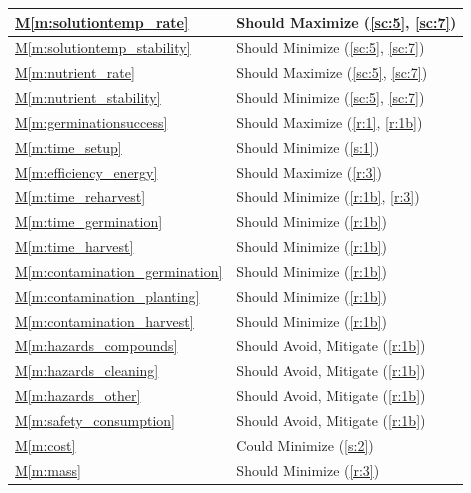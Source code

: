 \documentclass{report}
\newcommand{\mref}[1]{\hyperref[#1]{M\ref{#1}}}
\begin{document}
\begin{tabular}{|l|p{14.35cm}|}
    \hline
    \mref{m:solutiontemp_rate} & Should Maximize \hfill (\ref{sc:5}, \ref{sc:7}) \\
    \hline
    \mref{m:solutiontemp_stability} & Should Minimize \hfill (\ref{sc:5}, \ref{sc:7}) \\
    \hline
    \mref{m:nutrient_rate} & Should Maximize \hfill (\ref{sc:5}, \ref{sc:7}) \\
    \hline
    \mref{m:nutrient_stability} & Should Minimize \hfill (\ref{sc:5}, \ref{sc:7}) \\
    \hline
    \mref{m:germinationsuccess} & Should Maximize \hfill (\ref{r:1}, \ref{r:1b}) \\
    \hline
    \mref{m:time_setup} & Should Minimize \hfill (\ref{s:1}) \\
    \hline
    \mref{m:efficiency_energy} & Should Maximize \hfill (\ref{r:3}) \\
    \hline
    \mref{m:time_reharvest} & Should Minimize \hfill (\ref{r:1b}, \ref{r:3}) \\
    \hline
    \mref{m:time_germination} & Should Minimize \hfill (\ref{r:1b}) \\
    \hline
    \mref{m:time_harvest} & Should Minimize \hfill (\ref{r:1b}) \\
    \hline
    \mref{m:contamination_germination} & Should Minimize \hfill (\ref{r:1b}) \\
    \hline
    \mref{m:contamination_planting} & Should Minimize \hfill (\ref{r:1b}) \\
    \hline
    \mref{m:contamination_harvest} & Should Minimize \hfill (\ref{r:1b}) \\
    \hline
    \mref{m:hazards_compounds} & Should Avoid, Mitigate \hfill (\ref{r:1b}) \\
    \hline
    \mref{m:hazards_cleaning} & Should Avoid, Mitigate \hfill (\ref{r:1b}) \\
    \hline
    \mref{m:hazards_other} & Should Avoid, Mitigate \hfill (\ref{r:1b}) \\
    \hline
    \mref{m:safety_consumption} & Should Avoid, Mitigate \hfill (\ref{r:1b}) \\
    \hline
    \mref{m:cost} & Could Minimize \hfill (\ref{s:2}) \\
    \hline
    \mref{m:mass} & Should Minimize \hfill (\ref{r:3}) \\
    \hline
\end{tabular}

\end{document}
